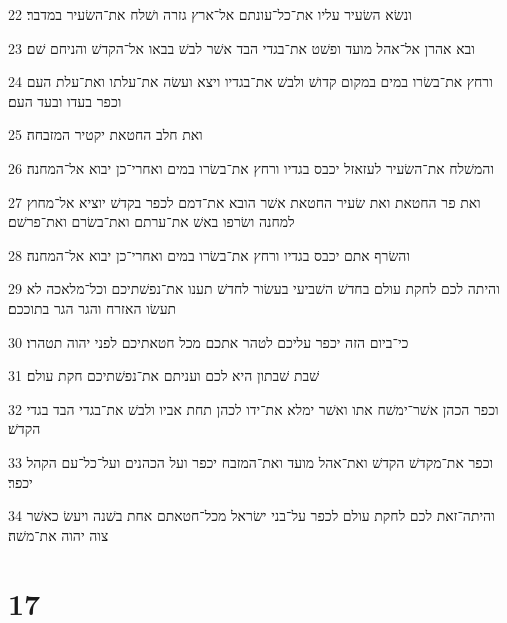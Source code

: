 \par 22 ונשׂא השׂעיר עליו את־כל־עונתם אל־ארץ גזרה ושׁלח את־השׂעיר במדבר׃
\par 23 ובא אהרן אל־אהל מועד ופשׁט את־בגדי הבד אשׁר לבשׁ בבאו אל־הקדשׁ והניחם שׁם׃
\par 24 ורחץ את־בשׂרו במים במקום קדושׁ ולבשׁ את־בגדיו ויצא ועשׂה את־עלתו ואת־עלת העם וכפר בעדו ובעד העם׃
\par 25 ואת חלב החטאת יקטיר המזבחה׃
\par 26 והמשׁלח את־השׂעיר לעזאזל יכבס בגדיו ורחץ את־בשׂרו במים ואחרי־כן יבוא אל־המחנה׃
\par 27 ואת פר החטאת ואת שׂעיר החטאת אשׁר הובא את־דמם לכפר בקדשׁ יוציא אל־מחוץ למחנה ושׂרפו באשׁ את־ערתם ואת־בשׂרם ואת־פרשׁם׃
\par 28 והשׂרף אתם יכבס בגדיו ורחץ את־בשׂרו במים ואחרי־כן יבוא אל־המחנה׃
\par 29 והיתה לכם לחקת עולם בחדשׁ השׁביעי בעשׂור לחדשׁ תענו את־נפשׁתיכם וכל־מלאכה לא תעשׂו האזרח והגר הגר בתוככם׃
\par 30 כי־ביום הזה יכפר עליכם לטהר אתכם מכל חטאתיכם לפני יהוה תטהרו׃
\par 31 שׁבת שׁבתון היא לכם ועניתם את־נפשׁתיכם חקת עולם׃
\par 32 וכפר הכהן אשׁר־ימשׁח אתו ואשׁר ימלא את־ידו לכהן תחת אביו ולבשׁ את־בגדי הבד בגדי הקדשׁ׃
\par 33 וכפר את־מקדשׁ הקדשׁ ואת־אהל מועד ואת־המזבח יכפר ועל הכהנים ועל־כל־עם הקהל יכפר׃
\par 34 והיתה־זאת לכם לחקת עולם לכפר על־בני ישׂראל מכל־חטאתם אחת בשׁנה ויעשׂ כאשׁר צוה יהוה את־משׁה׃

\chapter{17}

